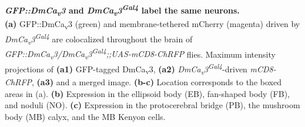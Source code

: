 \label{fig:S1}
\textbf{\emph{GFP::DmCa\textsubscript{v}3} and \emph{DmCa\textsubscript{v}3\textsuperscript{Gal4}} label the same neurons.}
\\
\textbf{(a)} GFP::DmCa\textsubscript{v}3 (green) and membrane-tethered mCherry (magenta) driven by \emph{DmCa\textsubscript{v}3\textsuperscript{Gal4}} are colocalized throughout the brain of \emph{GFP::DmCa\textsubscript{v}3/DmCa\textsubscript{v}3\textsuperscript{Gal4};;UAS-mCD8-ChRFP} flies.
Maximum intensity projections of \textbf{(a1)} GFP-tagged DmCa\textsubscript{v}3, \textbf{(a2)} \emph{DmCa\textsubscript{v}3\textsuperscript{Gal4}}-driven \emph{mCD8-ChRFP}, \textbf{(a3)} and a merged image.
\textbf{(b-c)} Location corresponds to the boxed areas in (a).
\textbf{(b)} Expression in the ellipsoid body (EB), fan-shaped body (FB), and noduli (NO).
\textbf{(c)} Expression in the protocerebral bridge (PB), the mushroom body (MB) calyx, and the MB Kenyon cells. 
